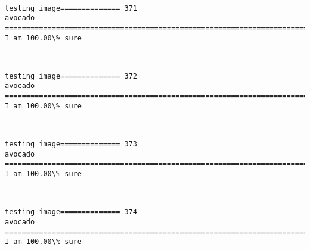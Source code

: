 \documentclass[11pt]{article}
\begin{document}
    \begin{center}
    \end{center}
    { \hspace*{\fill} \\}
    
    \begin{Verbatim}[commandchars=\\\{\}]
testing image============== 371
avocado
============================================================================
I am 100.00\% sure

    \end{Verbatim}

    \begin{center}
    \end{center}
    { \hspace*{\fill} \\}
    
    \begin{Verbatim}[commandchars=\\\{\}]
testing image============== 372
avocado
============================================================================
I am 100.00\% sure

    \end{Verbatim}

    \begin{center}
    \end{center}
    { \hspace*{\fill} \\}
    
    \begin{Verbatim}[commandchars=\\\{\}]
testing image============== 373
avocado
============================================================================
I am 100.00\% sure

    \end{Verbatim}

    \begin{center}
    \end{center}
    { \hspace*{\fill} \\}
    
    \begin{Verbatim}[commandchars=\\\{\}]
testing image============== 374
avocado
============================================================================
I am 100.00\% sure

    \end{Verbatim}
\end{document}
